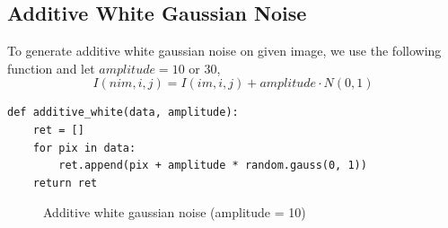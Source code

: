\documentclass[14pt,a4paper]{extarticle}
\begin{document}
\subsection{Additive White Gaussian Noise}

To generate additive white gaussian noise on given image, we use the following function and let $amplitude = 10 \text{ or } 30$,
\[ I(nim,i,j) = I(im,i,j) + amplitude \cdot N(0,1) \]

\begin{lstlisting}
def additive_white(data, amplitude):
	ret = []
	for pix in data:
		ret.append(pix + amplitude * random.gauss(0, 1))
	return ret
\end{lstlisting}

\begin{figure}[H]
\centering
	\hfill
\caption{Additive white gaussian noise (amplitude = 10)}
\end{figure}
\end{document}
